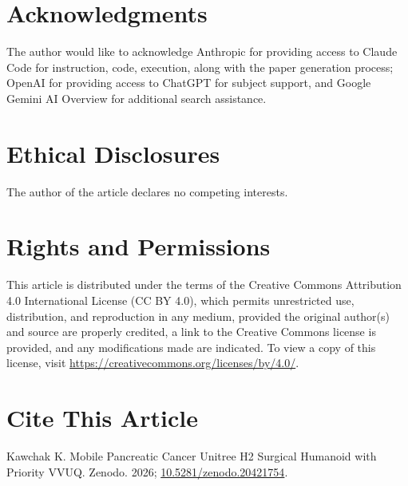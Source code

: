 
{}
\section*{Acknowledgments}
\label{sec:acknowledgments}
\vspace{-0.15cm}
The author would like to acknowledge Anthropic for providing access to Claude
Code for instruction, code, execution, along with the paper generation process;
OpenAI for providing access to ChatGPT for subject support, and Google
Gemini AI Overview for additional search assistance.

\vspace{-0.1cm}

{}
\section*{Ethical Disclosures}
\label{sec:ethics}
\vspace{-0.15cm}
The author of the article declares no competing interests.

\vspace{-0.1cm}

{}
\section*{Rights and Permissions}
\label{sec:rights}
\vspace{-0.15cm}
This article is distributed under the terms of the Creative Commons Attribution
4.0 International License (CC BY 4.0), which permits unrestricted use,
distribution, and reproduction in any medium, provided the original author(s) and
source are properly credited, a link to the Creative Commons license is provided,
and any modifications made are indicated. To view a copy of this license, visit
\url{https://creativecommons.org/licenses/by/4.0/}.

\vspace{-0.1cm}

{}
\section*{Cite This Article}
\label{sec:cite}
\vspace{-0.15cm}
Kawchak K. Mobile Pancreatic Cancer Unitree H2 Surgical Humanoid with Priority VVUQ. Zenodo. 2026;
\href{https://doi.org/10.5281/zenodo.20421754}{10.5281/zenodo.20421754}.

